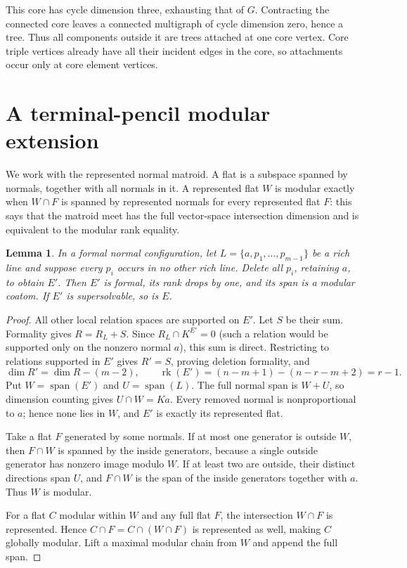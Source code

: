 \documentclass[11pt]{article}
\newtheorem{lemma}{Lemma}
\newcommand{\rk}{\operatorname{rk}}
\newcommand{\spanof}{\operatorname{span}}
\begin{document}
This core has cycle dimension three, exhausting that of $G$. Contracting the connected core leaves a connected multigraph of cycle dimension zero, hence a tree. Thus all components outside it are trees attached at one core vertex. Core triple vertices already have all their incident edges in the core, so attachments occur only at core element vertices.

\section{A terminal-pencil modular extension}
We work with the represented normal matroid. A flat is a subspace spanned by normals, together with all normals in it. A represented flat $W$ is modular exactly when $W\cap F$ is spanned by represented normals for every represented flat $F$: this says that the matroid meet has the full vector-space intersection dimension and is equivalent to the modular rank equality.

\begin{lemma}\label{lem:prune}
In a formal normal configuration, let $L=\{a,p_1,\ldots,p_{m-1}\}$ be a rich line and suppose every $p_i$ occurs in no other rich line. Delete all $p_i$, retaining $a$, to obtain $E'$. Then $E'$ is formal, its rank drops by one, and its span is a modular coatom. If $E'$ is supersolvable, so is $E$.
\end{lemma}
\begin{proof}
All other local relation spaces are supported on $E'$. Let $S$ be their sum. Formality gives $R=R_L+S$. Since $R_L\cap K^{E'}=0$ (such a relation would be supported only on the nonzero normal $a$), this sum is direct. Restricting to relations supported in $E'$ gives $R'=S$, proving deletion formality, and
\[
\dim R'=\dim R-(m-2),\qquad
\rk(E')=(n-m+1)-(n-r-m+2)=r-1.
\]
Put $W=\spanof(E')$ and $U=\spanof(L)$. The full normal span is $W+U$, so dimension counting gives $U\cap W=Ka$. Every removed normal is nonproportional to $a$; hence none lies in $W$, and $E'$ is exactly its represented flat.

Take a flat $F$ generated by some normals. If at most one generator is outside $W$, then $F\cap W$ is spanned by the inside generators, because a single outside generator has nonzero image modulo $W$. If at least two are outside, their distinct directions span $U$, and $F\cap W$ is the span of the inside generators together with $a$. Thus $W$ is modular.

For a flat $C$ modular within $W$ and any full flat $F$, the intersection $W\cap F$ is represented. Hence $C\cap F=C\cap(W\cap F)$ is represented as well, making $C$ globally modular. Lift a maximal modular chain from $W$ and append the full span.
\end{proof}
\end{document}
